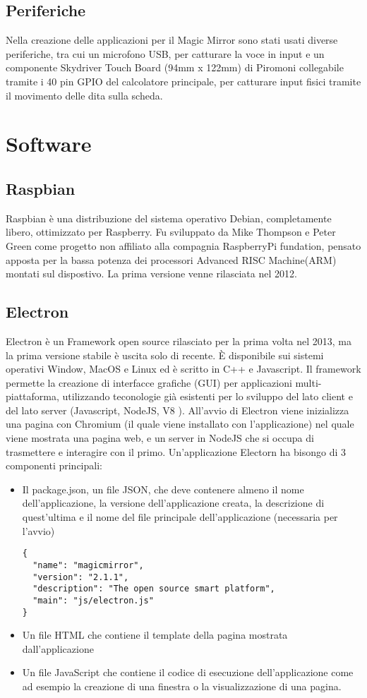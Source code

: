 \subsection{Periferiche}
Nella creazione delle applicazioni per il Magic Mirror sono stati usati diverse periferiche, tra cui un microfono
USB, per catturare la voce in input e un componente Skydriver Touch Board (94mm x 122mm) di Piromoni collegabile tramite
i 40 pin GPIO del calcolatore principale, per catturare input fisici tramite il movimento delle dita sulla scheda.

\section{Software}
\subsection{Raspbian}
Raspbian \`e una distribuzione del sistema operativo Debian, completamente libero,
ottimizzato per Raspberry.
Fu sviluppato da Mike Thompson e Peter Green come progetto non affiliato alla compagnia RaspberryPi
fundation, pensato apposta per la bassa potenza dei processori Advanced RISC Machine(ARM) montati sul
dispostivo.
La prima versione venne rilasciata nel 2012.

\subsection{Electron}
Electron \`e un Framework open source rilasciato per la prima volta nel 2013, ma la prima versione
stabile \`e uscita solo di recente. \`E disponibile sui sistemi operativi Window, MacOS e Linux ed \`e scritto
in C++ e Javascript. Il framework permette la creazione di interfacce grafiche (GUI) per
applicazioni multi-piattaforma, utilizzando teconologie gi\`a esistenti per lo sviluppo
del lato client e del lato server (Javascript, NodeJS, V8 \cite{V8}).
All'avvio di Electron viene inizializza una pagina con Chromium \cite{Chromium}(il quale viene installato con l'applicazione)
nel quale viene mostrata una pagina web, e un server in NodeJS che si occupa di trasmettere e interagire con il primo.
Un'applicazione Electorn ha bisongo di 3 componenti principali:
\begin{itemize}
\item Il package.json, un file JSON, che deve contenere almeno il nome dell'applicazione,
la versione dell'applicazione creata, la descrizione di quest'ultima e il
 nome del file principale dell'applicazione (necessaria per l'avvio)
\begin{lstlisting}
{
  "name": "magicmirror",
  "version": "2.1.1",
  "description": "The open source smart platform",
  "main": "js/electron.js"
}
\end{lstlisting}
\item Un file HTML che contiene il template della pagina mostrata dall'applicazione
\item Un file JavaScript che contiene il codice di esecuzione dell'applicazione come ad esempio la
creazione di una finestra o la visualizzazione di una pagina.
\end{itemize}

